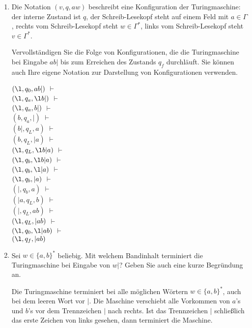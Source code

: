 \documentclass{lehramt-informatik-aufgabe}
\begin{document}
\begin{enumerate}


\item Die Notation $(v,q,aw)$ beschreibt eine Konfiguration der
Turingmaschine: der interne Zustand ist $q$, der Schreib-Lesekopf steht
auf einem Feld mit $a \in \Gamma$, rechts vom Schreib-Lesekopf steht $w
\in \Gamma^*$, links vom Schreib-Lesekopf steht $v \in \Gamma^*$.

Vervollständigen Sie die Folge von Konfigurationen, die die
Turingmaschine bei Eingabe $ab|$ bis zum Erreichen des Zustands $q_f$
durchläuft. Sie können auch Ihre eigene Notation zur Darstellung von
Konfigurationen verwenden.

\def\p{ $\vdash$ \\}

\begin{liAntwort}
$(\l, q_0, a b | )$ \p %
$(\l, q_a, \l b | )$ \p %
$(\l, q_a, b | )$ \p %
$(b, q_a, |)$ \p %
$(b|, q_L, a)$ \p %
$(b, q_L, | a)$ \p %
$(\l, q_L, \l b | a)$ \p %
$(\l, q_b, \l b | a)$ \p %
$(\l, q_b, \l | a)$ \p %
$(\l, q_b, | a)$ \p %
$(|, q_b, a)$ \p %
$(|a, q_L, b)$ \p %
$(|, q_L, a b)$ \p %
$(\l, q_L, | a b)$ \p %
$(\l, q_0, \l | a b)$ \p %
$(\l, q_f, | a b)$ %
\end{liAntwort}


\item Sei $w \in \{ a, b \}^*$ beliebig. Mit welchem Bandinhalt
terminiert die Turingmaschine bei Eingabe von $w|$? Geben Sie auch eine
kurze Begründung an.

\begin{liAntwort}
Die Turingmaschine terminiert bei alle möglichen Wörtern $w \in \{ a, b
\}^*$, auch bei dem leeren Wort vor $|$. Die Maschine verschiebt alle
Vorkommen von $a$’s und $b$’s vor dem Trennzeichen $|$ nach rechts. Ist
das Trennzeichen $|$ schließlich das erste Zeichen von links gesehen,
dann terminiert die Maschine.
\end{liAntwort}
\end{enumerate}
\end{document}
